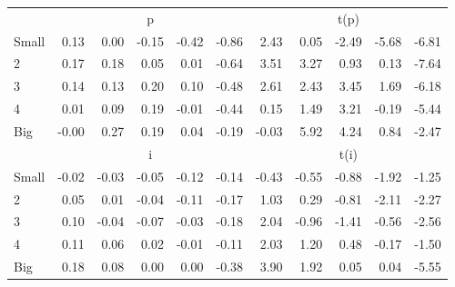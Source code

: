 \begin{table}[!ht]
\begin{tabular}{lrrrrrrrrrr}
      & \multicolumn{5}{c}{p} & \multicolumn{5}{c}{t(p)}
    
    \\
      \cmidrule(r){2-6} \cmidrule(r){7-11}

    Small   & 0.13  & 0.00  & -0.15  & -0.42  & -0.86  & 2.43  & 0.05  & -2.49  & -5.68  & -6.81  \\
         2  & 0.17  & 0.18  & 0.05  & 0.01  & -0.64  & 3.51  & 3.27  & 0.93  & 0.13  & -7.64  \\
         3  & 0.14  & 0.13  & 0.20  & 0.10  & -0.48  & 2.61  & 2.43  & 3.45  & 1.69  & -6.18  \\
         4  & 0.01  & 0.09  & 0.19  & -0.01  & -0.44  & 0.15  & 1.49  & 3.21  & -0.19  & -5.44  \\
    Big     & -0.00  & 0.27  & 0.19  & 0.04  & -0.19  & -0.03  & 5.92  & 4.24  & 0.84  & -2.47  \\

  
    
      & \multicolumn{5}{c}{i} & \multicolumn{5}{c}{t(i)}
    
    \\
      \cmidrule(r){2-6} \cmidrule(r){7-11}

    Small   & -0.02  & -0.03  & -0.05  & -0.12  & -0.14  & -0.43  & -0.55  & -0.88  & -1.92  & -1.25  \\
         2  & 0.05  & 0.01  & -0.04  & -0.11  & -0.17  & 1.03  & 0.29  & -0.81  & -2.11  & -2.27  \\
         3  & 0.10  & -0.04  & -0.07  & -0.03  & -0.18  & 2.04  & -0.96  & -1.41  & -0.56  & -2.56  \\
         4  & 0.11  & 0.06  & 0.02  & -0.01  & -0.11  & 2.03  & 1.20  & 0.48  & -0.17  & -1.50  \\
    Big     & 0.18  & 0.08  & 0.00  & 0.00  & -0.38  & 3.90  & 1.92  & 0.05  & 0.04  & -5.55  \\

  

  \bottomrule
\end{tabular}
\label{tbl:25_Size_Var_F16}
\end{table}